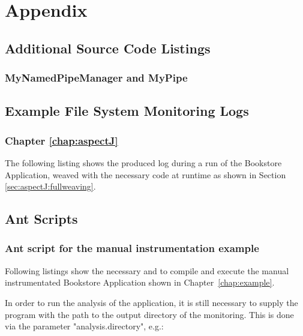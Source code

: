 % 


\appendix
\chapter{Appendix}

  \section{Additional Source Code Listings}
    \subsection{MyNamedPipeManager and MyPipe}
      \setJavaCodeListing
      

      \setJavaCodeListing
      

\newpage
  \section{Example File System Monitoring Logs}

	\subsection{Chapter \ref{chap:aspectJ}}
	    The following listing shows the produced log during a run of the Bookstore Application, weaved with the necessary code at runtime as shown in Section \ref{sec:aspectJ:fullweaving}.
		
	
\newpage
  \section{Ant Scripts}
    \subsection{Ant script for the manual instrumentation example}
      Following listings show the necessary  and  to compile and execute the manual instrumentated Bookstore Application shown in Chapter~\ref{chap:example}.
      \setXMLListing
      
      
      In order to run the analysis of the application, it is still necessary to supply the program with the path to the output directory of the monitoring. This is done via the parameter "analysis.directory", e.g.:
      \setBashListing
      

